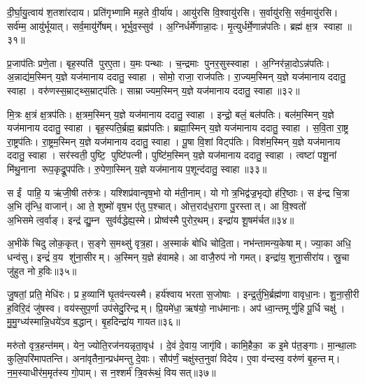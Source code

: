 दी॒र्घा॒यु॒त्वाय॑ श॒तशा॑रदाय। प्रति॑गृभ्णामि मह॒ते वी॒र्या॑य। आयु॑रसि वि॒श्वायु॑रसि। स॒र्वायु॑रसि॒ सर्व॒मायु॑रसि। सर्व॑म्म॒ आयु॑र्भूयात्। सर्व॒मायु॑र्गेषम्। भूर्भुव॒स्सुव॑। अ॒ग्निर्धर्मे॑णान्ना॒दः। मृ॒त्युर्धर्मे॒णान्न॑पतिः। ब्रह्म॑ क्ष॒त्र स्वाहा॥३१॥

प्र॒जाप॑तिः प्रणे॒ता। बृह॒स्पति॑ पुरए॒ता। य॒मः पन्थाः। च॒न्द्रमाः पुनर॒सुस्स्वाहा। अ॒ग्निर॑न्ना॒दोऽन्न॑पतिः। अ॒न्नाद्य॑म॒स्मिन् य॒ज्ञे यज॑मानाय ददातु॒ स्वाहा। सोमो॒ राजा॒ राज॑पतिः। रा॒ज्यम॒स्मिन् य॒ज्ञे यज॑मानाय ददातु॒ स्वाहा। वरु॑णस्स॒म्राट्थ्स॒म्राट्प॑तिः। साम्राज्यम॒स्मिन् य॒ज्ञे यज॑मानाय ददातु॒ स्वाहा॥३२॥

मि॒त्रः क्ष॒त्रं क्ष॒त्रप॑तिः। क्ष॒त्रम॒स्मिन् य॒ज्ञे यज॑मानाय ददातु॒ स्वाहा। इन्द्रो॒ बलं॒ बल॑पतिः। बल॑म॒स्मिन् य॒ज्ञे यज॑मानाय ददातु॒ स्वाहा। बृह॒स्पति॒र्ब्रह्म॒ ब्रह्म॑पतिः। ब्रह्मा॒स्मिन् य॒ज्ञे यज॑मानाय ददातु॒ स्वाहा। स॒वि॒ता रा॒ष्ट्र रा॒ष्ट्रप॑तिः। रा॒ष्ट्रम॒स्मिन् य॒ज्ञे यज॑मानाय ददातु॒ स्वाहा। पू॒षा वि॒शां विट्प॑तिः। विश॑म॒स्मिन् य॒ज्ञे यज॑मानाय ददातु॒ स्वाहा। सर॑स्वती॒ पुष्टि॒ पुष्टि॑पत्नी। पुष्टि॑म॒स्मिन् य॒ज्ञे यज॑मानाय ददातु॒ स्वाहा। त्वष्टा॑ पशू॒नां मि॑थु॒नाना रूप॒कृद्रू॒पप॑तिः। रु॒पेणा॒स्मिन् य॒ज्ञे यज॑मानाय प॒शून्द॑दातु॒ स्वाहा॥३३॥\anuvakamend[च॒ स्वाहा॒ साम्राज्यम॒स्मिन् य॒ज्ञे यज॑मानाय ददातु॒ स्वाहा॒ विश॑म॒स्मिन् य॒ज्ञे यज॑मानाय ददातु॒ स्वाहा॑ च॒त्वारि॑ च (अ॒ग्निस्सोमो॒ वरु॑णो मि॒त्र इन्द्रो॒ बृह॒स्पति॑स्सवि॒ता पू॒षा सर॑स्वती॒ त्वष्टा॒ दश॑ ॥ )]

स ईं पाहि॒ य ऋ॑जी॒षी तरु॑त्रः। यश्शिप्र॑वान्वृष॒भो यो म॑ती॒नाम्। यो गोत्र॒भिद्व॑ज्र॒भृद्यो ह॑रि॒ष्ठाः। स इ॑न्द्र चि॒त्रा अ॒भि तृ॑न्धि॒ वाजान्॑। आ ते॒ शुष्मो॑ वृष॒भ ए॑तु प॒श्चात्। ओत्त॒राद॑ध॒रागा पु॒रस्तात्। आ वि॒श्वतो॑ अ॒भिसमेत्व॒र्वाङ्। इन्द्र॑ द्यु॒म्न सुव॑र्वद्धेह्य॒स्मे। प्रोष्व॑स्मै पुरोर॒थम्। इन्द्रा॑य शू॒षम॑र्चत॥३४॥

अ॒भीके॑ चिदु लोक॒कृत्। स॒ङ्गे स॒मथ्सु॑ वृत्र॒हा। अ॒स्माकं॑ बोधि चोदि॒ता। नभ॑न्तामन्य॒केषाम्। ज्या॒का अधि॒ धन्व॑सु। इन्द्रं॑ व॒य शु॑ना॒सीरम्। अ॒स्मिन् य॒ज्ञे ह॑वामहे। आ वाजै॒रुप॑ नो गमत्। इन्द्रा॑य॒ शुना॒सीरा॑य। स्रु॒चा जु॑हुत नो ह॒विः॥३५॥

जु॒षतां॒ प्रति॒ मेधि॑रः। प्र ह॒व्यानि॑ घृ॒तव॑न्त्यस्मै। हर्य॑श्वाय भरता स॒जोषाः। इन्द्र॒र्तुभि॒र्ब्रह्म॑णा वावृधा॒नः। शु॒ना॒सी॒री ह॒विरि॒दं जु॑षस्व। वय॑स्सुप॒र्णा उप॑सेदु॒रिन्द्रम्। प्रि॒यमे॑धा॒ ऋष॑यो॒ नाध॑मानाः। अप॑ ध्वा॒न्तमूर्णु॒हि पू॒र्धि चक्षु॑। मु॒मु॒ग्ध्य॑स्मान्नि॒धये॑ऽव ब॒द्धान्। बृ॒हदिन्द्रा॑य गायत॥३६॥

मरु॑तो वृत्र॒हन्त॑मम्। येन॒ ज्योति॒रज॑नयन्नृता॒वृध॑। दे॒वं दे॒वाय॒ जागृ॑वि। कामि॒हैका॒ क इ॒मे प॑त॒ङ्गाः। मा॒न्था॒लाः कुलि॒परि॑मापतन्ति। अना॑वृतैना॒न्प्रध॑मन्तु दे॒वाः। सौप॑र्णं॒ चक्षु॑स्त॒नुवा॑ विदेय। ए॒वा व॑न्दस्व॒ वरु॑णं बृ॒हन्तम्। न॒म॒स्याधीर॑म॒मृत॑स्य गो॒पाम्। स न॒श्शर्म॑ त्रि॒वरू॑थं॒ वियसत्॥३७॥

